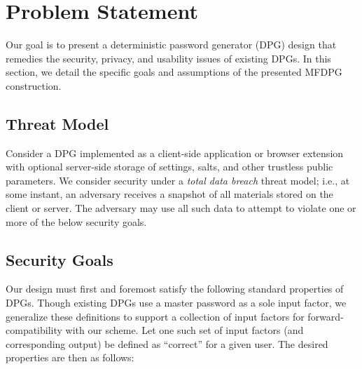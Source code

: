 \twocolumn

\section{Problem Statement}
\label{sec:problem}

Our goal is to present a deterministic password generator (DPG) design that remedies the security, privacy, and usability issues of existing DPGs. In this section, we detail the specific goals and assumptions of the presented MFDPG construction.

\subsection{Threat Model}
Consider a DPG implemented as a client-side application or browser extension with optional server-side storage of settings, salts, and other trustless public parameters. 
We consider security under a \textit{total data breach} threat model; i.e., at some instant, an adversary receives a snapshot of all materials stored on the client or server. The adversary may use all such data to attempt to violate one or more of the below security goals.



\subsection{Security Goals}
\label{sec:goals}

Our design must first and foremost satisfy the following standard properties of DPGs. Though existing DPGs use a master password as a sole input factor, we generalize these definitions to support a collection of input factors for forward-compatibility with our scheme. Let one such set of input factors (and corresponding output) be defined as ``correct'' for a given user. The desired properties are then as follows:

